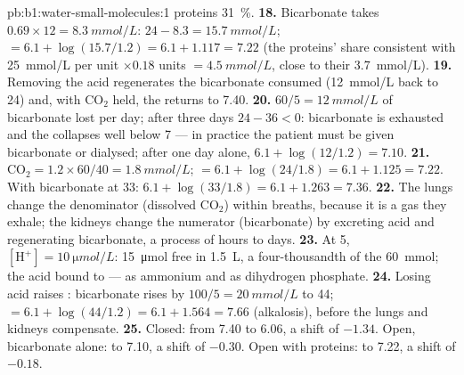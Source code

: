 \begin{solution}{pb:b1:water-small-molecules:1}
proteins \qty{31}{\%}.
\textbf{18.} Bicarbonate takes $0.69\times 12 = \qty{8.3}{mmol/L}$:
$24 - 8.3 = \qty{15.7}{mmol/L}$;  $= 6.1 + \log(15.7/1.2) = 6.1 +
1.117 = 7.22$ (the proteins' share consistent with \qty{25}{mmol/L}
per unit $\times 0.18$ units $= \qty{4.5}{mmol/L}$, close to their
\qty{3.7}{mmol/L}).
\textbf{19.} Removing the acid regenerates the bicarbonate consumed
(\qty{12}{mmol/L} back to \qty{24}{}) and, with $\mathrm{CO_2}$ held,
the  returns to 7.40.
\textbf{20.} $60/5 = \qty{12}{mmol/L}$ of bicarbonate lost per day;
after three days $24 - 36 < 0$: bicarbonate is exhausted and the 
collapses well below 7 --- in practice the patient must be given
bicarbonate or dialysed; after one day alone, $6.1 + \log(12/1.2) =
7.10$.
\textbf{21.} $\mathrm{CO_2} = 1.2\times 60/40 = \qty{1.8}{mmol/L}$;
 $= 6.1 + \log(24/1.8) = 6.1 + 1.125 = 7.22$. With bicarbonate at
\qty{33}{}: $6.1 + \log(33/1.8) = 6.1 + 1.263 = 7.36$.
\textbf{22.} The lungs change the denominator (dissolved
$\mathrm{CO_2}$) within breaths, because it is a gas they exhale; the
kidneys change the numerator (bicarbonate) by excreting acid and
regenerating bicarbonate, a process of hours to days.
\textbf{23.} At  5, $[\mathrm{H^+}] = \qty{10}{\micro mol/L}$: \qty{15}{\micro mol} free in \qty{1.5}{L}, a four-thousandth of the \qty{60}{mmol}; the acid  bound to  --- as ammonium and as dihydrogen phosphate.
\textbf{24.} Losing acid raises : bicarbonate rises by
$100/5 = \qty{20}{mmol/L}$ to \qty{44}{};  $= 6.1 + \log(44/1.2) =
6.1 + 1.564 = 7.66$ (alkalosis), before the lungs and kidneys
compensate.
\textbf{25.} Closed: from 7.40 to 6.06, a shift of $-1.34$. Open,
bicarbonate alone: to 7.10, a shift of $-0.30$. Open with proteins:
to 7.22, a shift of $-0.18$.
\end{solution}
